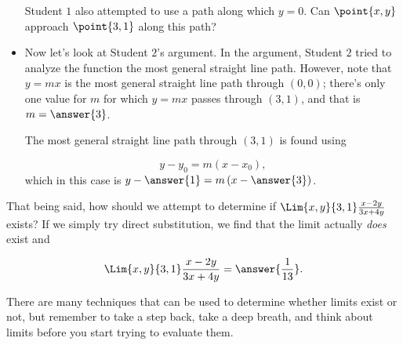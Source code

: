 \documentclass{ximera}
\begin{document}
\begin{exercise}
\begin{exercise}
\begin{itemize}
Student $1$ also attempted to use a path along which $y=0$.  Can $\point{x,y}$ approach $\point{3,1}$ along this path? 

\item Now let's look at Student $2$'s argument.  In the argument, Student $2$ tried to analyze the function the most general straight line path.  However, note that $y=mx$ is the most general straight line path through $(0,0)$; there's only one value for $m$ for which $y=mx$ passes through $(3,1)$, and that is $m= \answer{3}$.

The most general straight line path through $(3,1)$ is found using 

\[
y-y_0 = m(x-x_0),
\] 
which in this case is $y-\answer{1} = m\left(x-\answer{3}\right)$.
\end{itemize}

That being said, how should we attempt to determine if $\Lim{x,y}{3,1} \frac{x-2y}{3x+4y}$ exists? If we simply try direct substitution, we find that the limit actually \emph{does} exist and

\[
\Lim{x,y}{3,1} \frac{x-2y}{3x+4y} = \answer{\frac{1}{13}}.
\]

\begin{feedback}[correct]
There are many techniques that can be used to determine whether limits exist or not, but remember to take a step back, take a deep breath, and think about limits before you start trying to evaluate them.

\end{feedback}
 

\end{exercise}

 \end{exercise}
\end{document}
